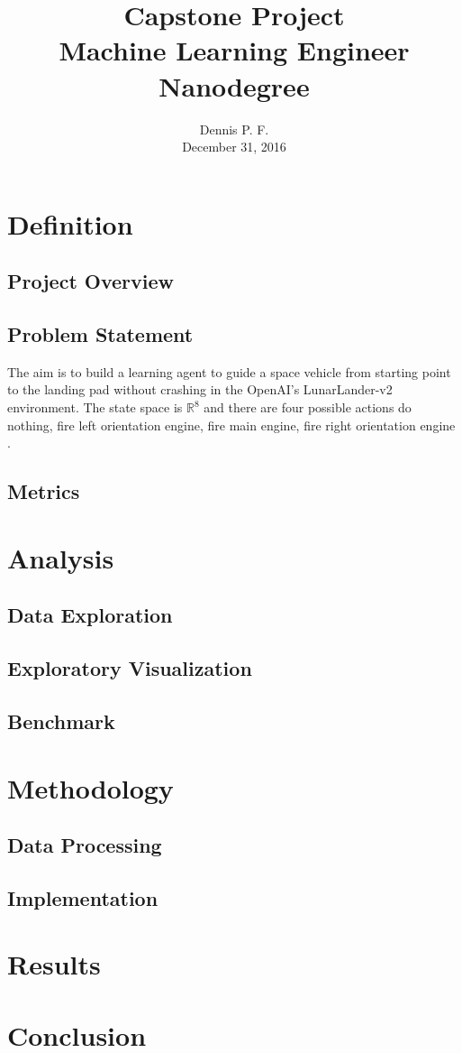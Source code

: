 \documentclass{svproc}
\begin{document}
\mainmatter
\title{Capstone Project \\ {\large Machine Learning Engineer Nanodegree}}
\author{{\large Dennis P. F.} \\ {\small December 31, 2016}}
\institute{}
\maketitle

\section{Definition}
\subsection*{Project Overview}
\subsection*{Problem Statement}
The aim is to build a learning agent to guide a space vehicle from starting point to the landing pad without crashing in the OpenAI's LunarLander-v2 environment. The state space is $\mathbb{R}^8$ and there are four possible actions { do nothing, fire left orientation engine, fire main engine, fire right orientation engine }.
\subsection*{Metrics}
\section{Analysis}
\subsection*{Data Exploration}
\subsection*{Exploratory Visualization}
\subsection*{Benchmark}
\section{Methodology}
\subsection*{Data Processing}
\subsection*{Implementation}
\section{Results}
\section{Conclusion}
\begin{thebibliography}{}

\end{thebibliography}
\end{document}
